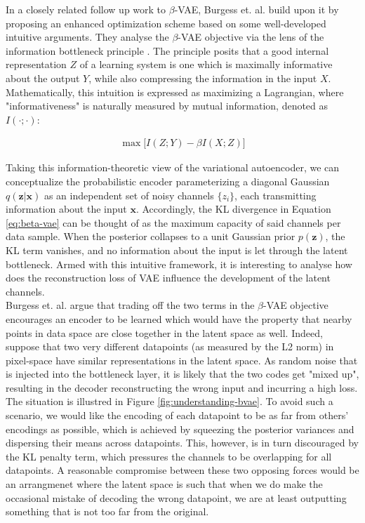 \documentclass{report}
\begin{document}
\noindent In a closely related follow up work to $\beta$-VAE, Burgess et. al. \cite{understanding-beta-vae} build upon it by proposing an enhanced optimization scheme based on some well-developed intuitive arguments. They analyse the $\beta$-VAE objective via the lens of the information bottleneck principle \cite{tishby-ib}. The principle posits that a good internal representation $Z$ of a learning system is one which is maximally informative about the output $Y$, while also compressing the information in the input $X$. Mathematically, this intuition is expressed as maximizing a Lagrangian, where "informativeness" is naturally measured by mutual information, denoted as $I(\cdot; \cdot)$:

\begin{equation}
\begin{gathered}
\max \big[ I(Z; Y) - \beta I(X;Z) \big]
\end{gathered}
\end{equation}

\bigskip

\noindent Taking this information-theoretic view of the variational autoencoder, we can conceptualize the probabilistic encoder parameterizing a diagonal Gaussian $q(\boldsymbol{z}|\boldsymbol{x})$ as an independent set of noisy channels $\{z_i\}$, each transmitting information about the input $\boldsymbol{x}$. Accordingly, the KL divergence in Equation \ref{eq:beta-vae} can be thought of as the maximum capacity of said channels per data sample. When the posterior collapses to a unit Gaussian prior $p(\boldsymbol{z})$, the KL term vanishes, and no information about the input is let through the latent bottleneck. Armed with this intuitive framework, it is interesting to analyse how does the reconstruction loss of VAE influence the development of the latent channels. \\

\noindent Burgess et. al. \cite{understanding-beta-vae} argue that trading off the two terms in the $\beta$-VAE objective encourages an encoder to be learned which would have the property that nearby points in data space are close together in the latent space as well. Indeed, suppose that two very different datapoints (as measured by the L2 norm) in pixel-space have similar representations in the latent space. As random noise that is injected into the bottleneck layer, it is likely that the two codes get "mixed up", resulting in the decoder reconstructing the wrong input and incurring a high loss. The situation is illustred in Figure \ref{fig:understanding-bvae}. To avoid such a scenario, we would like the encoding of each datapoint to be as far from others' encodings as possible, which is achieved by squeezing the posterior variances and dispersing their means across datapoints. This, however, is in turn discouraged by the KL penalty term, which pressures the channels to be overlapping for all datapoints. A reasonable compromise between these two opposing forces would be an arrangmenet where the latent space is such that when we do make the occasional mistake of decoding the wrong datapoint, we are at least outputting something that is not too far from the original. \\
\end{document}
